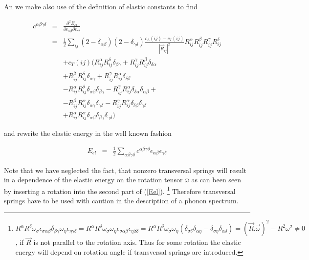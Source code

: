 An we make also use of the definition of elastic constants to find

\begin{eqnarray}\label{elconst}
c^{\alpha\beta\gamma\delta} &= &
\frac{\partial^2E_{el}}{\partial \epsilon_{\alpha\beta} \partial \epsilon_{\gamma\delta}} \\
&=& \frac{1}{2}\sum_{ij}(2-\delta_{\alpha\beta})(2-\delta_{\gamma\delta}) \frac{c_L(ij)-c_T(ij)}{|\vec R_{ij}|^2} 
R_{ij}^{\alpha}R_{ij}^{\beta}R_{ij}^{\gamma}R_{ij}^{\delta}
 \nonumber \\
& & +    c_T(ij)  ( R_{ij}^{\alpha}R_{ij}^{\delta}
 \delta_{\beta\gamma}  +   R_{ij}^{\gamma}R_{ij}^{\beta}
\delta_{\delta\alpha}  \nonumber \\
&& +    R_{ij}^{\beta}R_{ij}^{\delta}
 \delta_{\alpha\gamma}  +   R_{ij}^{\gamma}R_{ij}^{\alpha}
 \delta_{\delta\beta} \nonumber \\
& & -    R_{ij}^{\alpha}R_{ij}^{\delta}
 \delta_{\alpha\beta}\delta_{\beta\gamma}    -  R_{ij}^{\gamma}R_{ij}^{\alpha}
 \delta_{\delta\alpha} \delta_{\alpha\beta} + \nonumber \\
&& -    R_{ij}^{\beta}R_{ij}^{\alpha}
 \delta_{\alpha\gamma} \delta_{\gamma\delta}  -   R_{ij}^{\gamma}R_{ij}^{\alpha}
 \delta_{\delta\beta}\delta_{\gamma\delta}  \nonumber \\
& & +    R_{ij}^{\alpha}R_{ij}^{\alpha}
 \delta_{\alpha\beta}\delta_{\beta\gamma} \delta_{\gamma\delta}   ) \nonumber
\end{eqnarray}



and rewrite the elastic energy in the well known fashion

\begin{eqnarray}\label{Eelconst}
E_{el} &=& \frac{1}{2}\sum_{\alpha\beta\gamma\delta} c^{\alpha\beta\gamma\delta} \epsilon_{\alpha\beta}\epsilon_{\gamma\delta}
\end{eqnarray}



Note that we have neglected the fact, that nonzero transversal springs will 
result in a dependence of the elastic energy on the rotation tensor $\bar \omega$ as
can been seen by inserting a rotation into the second part of (\ref{Eel}).
\footnote{$R^{\alpha}R^{\delta}\omega_{\sigma}
\epsilon_{\sigma\alpha\beta}\delta_{\beta\gamma}\omega_{\eta}\epsilon_{\eta\gamma\delta}=
R^{\alpha}R^{\delta}\omega_{\sigma} \omega_{\eta}
\epsilon_{\sigma\alpha\beta}\epsilon_{\eta\beta\delta}=
R^{\alpha}R^{\delta}\omega_{\sigma} \omega_{\eta}
(\delta_{\sigma\delta}\delta_{\alpha\eta}-\delta_{\sigma\eta}\delta_{\alpha\delta})=
(\vec R . \vec \omega)^2-R^2\omega^2 \neq 0$,
if $\vec R$ is not parallel to the rotation axis. Thus for some rotation the elastic energy
will depend on rotation angle if transversal springs are  introduced.
}
Therefore transversal springs have to be used with caution
 in the description of a phonon spectrum.

